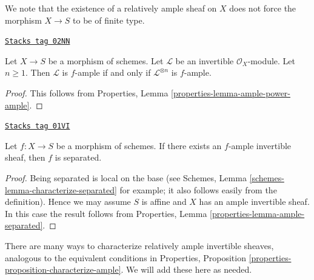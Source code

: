 We note that the existence of a relatively ample sheaf on $X$ does not
force the morphism $X \to S$ to be of finite type.

\begin{lemma}
\label{morphisms-lemma-ample-power-ample}
\href{https://stacks.math.columbia.edu/tag/02NN}{\texttt{Stacks tag 02NN}}

Let $X \to S$ be a morphism of schemes.
Let $\mathcal{L}$ be an invertible $\mathcal{O}_X$-module.
Let $n \geq 1$. Then $\mathcal{L}$ is $f$-ample if and only if
$\mathcal{L}^{\otimes n}$ is $f$-ample.
\end{lemma}

\begin{proof}
This follows from Properties, Lemma \ref{properties-lemma-ample-power-ample}.
\end{proof}

\begin{lemma}
\label{morphisms-lemma-relatively-ample-separated}
\href{https://stacks.math.columbia.edu/tag/01VI}{\texttt{Stacks tag 01VI}}

Let $f : X \to S$ be a morphism of schemes.
If there exists an $f$-ample invertible sheaf, then
$f$ is separated.
\end{lemma}

\begin{proof}
Being separated is local on the base (see
Schemes, Lemma \ref{schemes-lemma-characterize-separated} for example;
it also follows easily from the definition).
Hence we may assume $S$ is affine and $X$
has an ample invertible sheaf. In this case the
result follows from
Properties, Lemma \ref{properties-lemma-ample-separated}.
\end{proof}

There are many ways to characterize relatively ample invertible
sheaves, analogous to the equivalent conditions in
Properties, Proposition \ref{properties-proposition-characterize-ample}.
We will add these here as needed.

